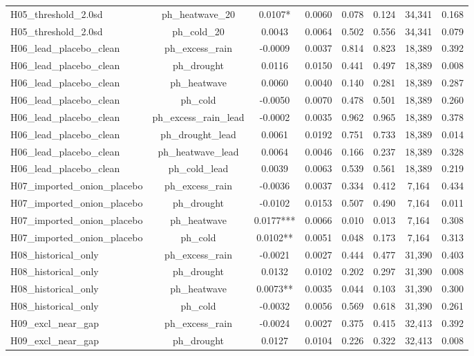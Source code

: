 \begin{table}[htbp]
\begin{tabular}{lccccccc}
H05\_threshold\_2.0sd & ph\_heatwave\_20 & 0.0107* & 0.0060 & 0.078 & 0.124 & 34,341 & 0.168 \\
H05\_threshold\_2.0sd & ph\_cold\_20 & 0.0043 & 0.0064 & 0.502 & 0.556 & 34,341 & 0.079 \\
H06\_lead\_placebo\_clean & ph\_excess\_rain & -0.0009 & 0.0037 & 0.814 & 0.823 & 18,389 & 0.392 \\
H06\_lead\_placebo\_clean & ph\_drought & 0.0116 & 0.0150 & 0.441 & 0.497 & 18,389 & 0.008 \\
H06\_lead\_placebo\_clean & ph\_heatwave & 0.0060 & 0.0040 & 0.140 & 0.281 & 18,389 & 0.287 \\
H06\_lead\_placebo\_clean & ph\_cold & -0.0050 & 0.0070 & 0.478 & 0.501 & 18,389 & 0.260 \\
H06\_lead\_placebo\_clean & ph\_excess\_rain\_lead & -0.0002 & 0.0035 & 0.962 & 0.965 & 18,389 & 0.378 \\
H06\_lead\_placebo\_clean & ph\_drought\_lead & 0.0061 & 0.0192 & 0.751 & 0.733 & 18,389 & 0.014 \\
H06\_lead\_placebo\_clean & ph\_heatwave\_lead & 0.0064 & 0.0046 & 0.166 & 0.237 & 18,389 & 0.328 \\
H06\_lead\_placebo\_clean & ph\_cold\_lead & 0.0039 & 0.0063 & 0.539 & 0.561 & 18,389 & 0.219 \\
H07\_imported\_onion\_placebo & ph\_excess\_rain & -0.0036 & 0.0037 & 0.334 & 0.412 & 7,164 & 0.434 \\
H07\_imported\_onion\_placebo & ph\_drought & -0.0102 & 0.0153 & 0.507 & 0.490 & 7,164 & 0.011 \\
H07\_imported\_onion\_placebo & ph\_heatwave & 0.0177*** & 0.0066 & 0.010 & 0.013 & 7,164 & 0.308 \\
H07\_imported\_onion\_placebo & ph\_cold & 0.0102** & 0.0051 & 0.048 & 0.173 & 7,164 & 0.313 \\
H08\_historical\_only & ph\_excess\_rain & -0.0021 & 0.0027 & 0.444 & 0.477 & 31,390 & 0.403 \\
H08\_historical\_only & ph\_drought & 0.0132 & 0.0102 & 0.202 & 0.297 & 31,390 & 0.008 \\
H08\_historical\_only & ph\_heatwave & 0.0073** & 0.0035 & 0.044 & 0.103 & 31,390 & 0.300 \\
H08\_historical\_only & ph\_cold & -0.0032 & 0.0056 & 0.569 & 0.618 & 31,390 & 0.261 \\
H09\_excl\_near\_gap & ph\_excess\_rain & -0.0024 & 0.0027 & 0.375 & 0.415 & 32,413 & 0.392 \\
H09\_excl\_near\_gap & ph\_drought & 0.0127 & 0.0104 & 0.226 & 0.322 & 32,413 & 0.008 \\

\end{tabular}
\end{table}

